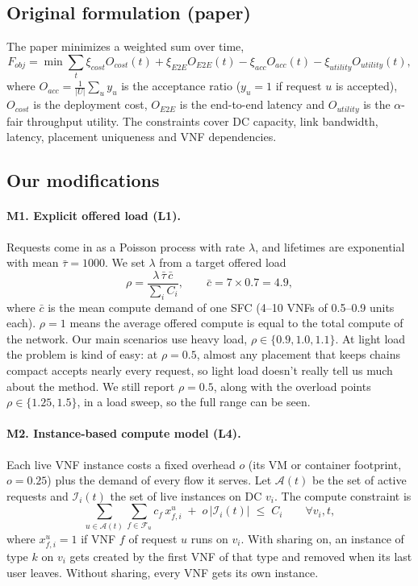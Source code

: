 \documentclass[11pt,a4paper]{article}
\begin{document}
\subsection{Original formulation (paper)}
The paper minimizes a weighted sum over time,
\begin{equation}
F_{obj} = \min \sum_{t} \xi_{cost} O_{cost}(t) + \xi_{E2E} O_{E2E}(t)
 - \xi_{acc} O_{acc}(t) - \xi_{utility} O_{utility}(t),
\end{equation}
where $O_{acc}=\frac{1}{|U|}\sum_u y_u$ is the acceptance ratio ($y_u=1$ if
request $u$ is accepted), $O_{cost}$ is the deployment cost, $O_{E2E}$ is the
end-to-end latency and $O_{utility}$ is the $\alpha$-fair throughput utility.
The constraints cover DC capacity, link bandwidth, latency, placement uniqueness
and VNF dependencies.

\subsection{Our modifications}

\paragraph{M1. Explicit offered load (L1).} Requests come in as a Poisson
process with rate $\lambda$, and lifetimes are exponential with mean
$\bar\tau=1000$. We set $\lambda$ from a target offered load
\begin{equation}
\rho = \frac{\lambda\,\bar\tau\,\bar c}{\sum_{i} C_i},
\qquad \bar c = 7\times 0.7 = 4.9,
\end{equation}
where $\bar c$ is the mean compute demand of one SFC (4--10 VNFs of
0.5--0.9 units each). $\rho=1$ means the average offered compute is equal to the
total compute of the network. Our main scenarios use heavy load,
$\rho\in\{0.9, 1.0, 1.1\}$. At light load the problem is kind of easy: at
$\rho=0.5$, almost any placement that keeps chains compact accepts nearly every
request, so light load doesn't really tell us much about the method. We still
report $\rho=0.5$, along with the overload points $\rho\in\{1.25, 1.5\}$, in a
load sweep, so the full range can be seen.

\paragraph{M2. Instance-based compute model (L4).} Each live VNF instance costs a
fixed overhead $o$ (its VM or container footprint, $o=0.25$) plus the demand of
every flow it serves. Let $\mathcal{A}(t)$ be the set of active requests and
$\mathcal{I}_i(t)$ the set of live instances on DC $v_i$. The compute
constraint is
\begin{equation}
\sum_{u\in\mathcal{A}(t)} \sum_{f\in\mathcal{F}_u} c_f\, x^u_{f,i}
\;+\; o\,|\mathcal{I}_i(t)| \;\le\; C_i \qquad \forall v_i, t,
\end{equation}
where $x^u_{f,i}=1$ if VNF $f$ of request $u$ runs on $v_i$. With sharing on, an
instance of type $k$ on $v_i$ gets created by the first VNF of that type and
removed when its last user leaves. Without sharing, every VNF gets its own
instance.
\end{document}
